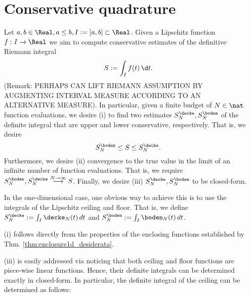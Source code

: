 \section{Conservative quadrature}

Let $a,b \in \Real, a \leq b, I := [a,b] \subset \Real$.
Given a Lipschitz function $f: I \to \Real $ we aim to compute conservative estimates of the definitive Riemann integral \[S := \int_{I} f(t) \, \d t.\] (Remark: PERHAPS CAN LIFT RIEMANN ASSUMPTION BY
AUGMENTING INTERVAL MEASURE ACCORDING TO AN ALTERNATIVE MEASURE).
In particular, given a finite budget of $N \in \nat$ function evaluations, we desire (i) to find two  estimates $S^\decke_N , S^\boden_N$ of the definite integral that are upper and lower conservative, respectively. That is, we desire 
\[S^\boden_N \leq S \leq S^\decke_N. \] Furthermore, we desire (ii) convergence to the true value in the limit of an infinite number of function evaluations. That is, we require
$S^\boden_N, S^\decke_N \stackrel{N \to \infty}{\longrightarrow} S $.
Finally, we desire (iii) $S^\decke_N,S^\boden_N$ to be closed-form. 

In the one-dimensional case, one obvious way to achieve this is to use the integrals of the Lipschitz ceiling and floor. That is, we define $S^\decke_N := \int_I \decke_N (t) \,dt $ and $S^\boden_N := \int_I \boden_N (t) \,dt $. 

(i) follows directly from the properties of the enclosing functions established by Thm. \ref{thm:enclosure1d_desiderata}.

 (iii) is easily addressed via noticing that both ceiling and floor functions are piece-wise linear functions. Hence, their definite integrals can be determined exactly in closed-form. In particular, the definite integral of the ceiling can be determined as follows:

